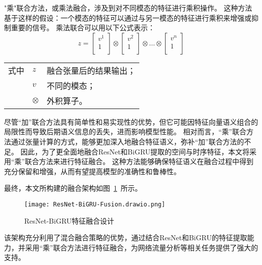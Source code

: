 "乘"联合方法，或乘法融合，涉及到对不同模态的特征进行乘积操作。
这种方法基于这样的假设：一个模态的特征可以通过与另一模态的特征进行乘积来增强或抑制重要的信号。
乘法联合可以用以下公式表示：
\begin{equation}
	z = \begin{bmatrix}v^1 \\1\\\end{bmatrix} \otimes \begin{bmatrix}v^2 \\1\\\end{bmatrix} \otimes \dots \otimes \begin{bmatrix}v^n \\1\\\end{bmatrix}
\end{equation}
\begin{flushleft}
	\renewcommand\arraystretch{1.25}
	\begin{tabularx}{\textwidth}{@{}>{\normalsize\rm}l@{\quad}>{\normalsize\rm}l@{——}>{\normalsize\rm}X@{}}
		式中 & $z$       & 融合张量后的结果输出； \\
		   & $v$       & 不同的模态；      \\
		   & $\otimes$ & 外积算子。       \\
	\end{tabularx}\vspace{.5ex}%
\end{flushleft}



尽管“加”联合方法具有简单性和易实现性的优势，但它可能因特征向量语义组合的局限性而导致后期语义信息的丢失，进而影响模型性能。
相对而言，“乘”联合方法通过张量计算的方式，能够更加深入地融合特征语义，弥补“加”联合方法的不足\cite{hejunandzhangcaiqing}。
因此，为了更全面地融合ResNet和BiGRU提取的空间与时序特征，本文将采用“乘”联合方法来进行特征融合。
这种方法能够确保特征语义在融合过程中得到充分保留和增强，从而有望提高模型的准确性和鲁棒性。\par

最终，本文所构建的融合架构如图~\ref{fig:ResNet-BiGRU-Fusion}~所示。
\begin{figure}[htbp]
	\centering
	\texttt{[image: ResNet-BiGRU-Fusion.drawio.png]}
	\caption{ResNet-BiGRU特征融合设计}
	\label{fig:ResNet-BiGRU-Fusion}
\end{figure}
该架构充分利用了混合融合策略的优势，通过结合ResNet和BiGRU的特征提取能力，并采用“乘”联合方法进行特征融合，为网络流量分析等相关任务提供了强大的支持。

